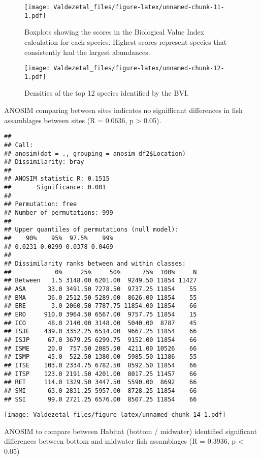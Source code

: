 \documentclass[12pt,]{article}
\begin{document}
\begin{figure}
\centering
\texttt{[image: Valdezetal\_files/figure-latex/unnamed-chunk-11-1.pdf]}
\caption{Boxplots showing the scores in the Biological Value Index
calculation for each species. Highest scores represent species that
consistently had the largest abundances.}
\end{figure}

\begin{figure}
\centering
\texttt{[image: Valdezetal\_files/figure-latex/unnamed-chunk-12-1.pdf]}
\caption{Densities of the top 12 species identified by the BVI.}
\end{figure}

\clearpage

ANOSIM comparing between sites indicates no signifficant differences in
fish assamblages between sites (R = 0.0636, p \textgreater{} 0.05).

\begin{verbatim}
## 
## Call:
## anosim(dat = ., grouping = anosim_df2$Location) 
## Dissimilarity: bray 
## 
## ANOSIM statistic R: 0.1515 
##       Significance: 0.001 
## 
## Permutation: free
## Number of permutations: 999
## 
## Upper quantiles of permutations (null model):
##    90%    95%  97.5%    99% 
## 0.0231 0.0299 0.0378 0.0469 
## 
## Dissimilarity ranks between and within classes:
##            0%     25%     50%      75%  100%     N
## Between   1.5 3148.00 6201.00  9249.50 11854 11427
## ASA      33.0 3491.50 7278.50  9737.25 11854    55
## BMA      36.0 2512.50 5289.00  8626.00 11854    55
## ERE       3.0 2060.50 7787.75 11854.00 11854    66
## ERO     910.0 3964.50 6567.00  9757.75 11854    15
## ICO      48.0 2140.00 3148.00  5040.00  8787    45
## ISJE    439.0 3352.25 6514.00  9667.25 11854    66
## ISJP     67.0 3679.25 6299.75  9152.00 11854    66
## ISME     20.0  757.50 2085.50  4211.00 10526    66
## ISMP     45.0  522.50 1380.00  5985.50 11386    55
## ITSE    103.0 2334.75 6782.50  8592.50 11854    66
## ITSP    123.0 2191.50 4201.00  8017.25 11457    66
## RET     114.0 1329.50 3447.50  5590.00  8692    66
## SMI      63.0 2831.25 5957.00  8728.25 11854    66
## SSI      99.0 2721.25 6576.00  8507.25 11854    66
\end{verbatim}

\texttt{[image: Valdezetal\_files/figure-latex/unnamed-chunk-14-1.pdf]}

ANOSIM to compare between Habitat (bottom / midwater) identified
significant differences between bottom and midwater fish assamblages (R
= 0.3936, p \textless{} 0.05)
\end{document}
